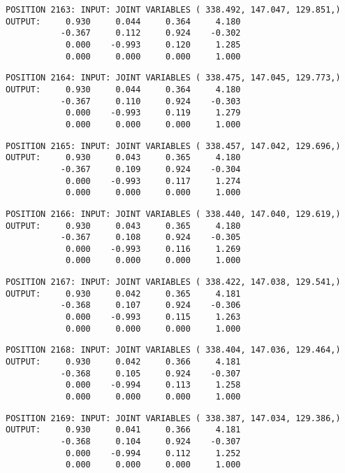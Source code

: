 \begin{verbatim}
POSITION 2163: INPUT: JOINT VARIABLES ( 338.492, 147.047, 129.851,)
OUTPUT:     0.930     0.044     0.364     4.180
           -0.367     0.112     0.924    -0.302
            0.000    -0.993     0.120     1.285
            0.000     0.000     0.000     1.000
\end{verbatim} \pagebreak[1]\begin{verbatim}
POSITION 2164: INPUT: JOINT VARIABLES ( 338.475, 147.045, 129.773,)
OUTPUT:     0.930     0.044     0.364     4.180
           -0.367     0.110     0.924    -0.303
            0.000    -0.993     0.119     1.279
            0.000     0.000     0.000     1.000
\end{verbatim} \pagebreak[1]\begin{verbatim}
POSITION 2165: INPUT: JOINT VARIABLES ( 338.457, 147.042, 129.696,)
OUTPUT:     0.930     0.043     0.365     4.180
           -0.367     0.109     0.924    -0.304
            0.000    -0.993     0.117     1.274
            0.000     0.000     0.000     1.000
\end{verbatim} \pagebreak[1]\begin{verbatim}
POSITION 2166: INPUT: JOINT VARIABLES ( 338.440, 147.040, 129.619,)
OUTPUT:     0.930     0.043     0.365     4.180
           -0.367     0.108     0.924    -0.305
            0.000    -0.993     0.116     1.269
            0.000     0.000     0.000     1.000
\end{verbatim} \pagebreak[1]\begin{verbatim}
POSITION 2167: INPUT: JOINT VARIABLES ( 338.422, 147.038, 129.541,)
OUTPUT:     0.930     0.042     0.365     4.181
           -0.368     0.107     0.924    -0.306
            0.000    -0.993     0.115     1.263
            0.000     0.000     0.000     1.000
\end{verbatim} \pagebreak[1]\begin{verbatim}
POSITION 2168: INPUT: JOINT VARIABLES ( 338.404, 147.036, 129.464,)
OUTPUT:     0.930     0.042     0.366     4.181
           -0.368     0.105     0.924    -0.307
            0.000    -0.994     0.113     1.258
            0.000     0.000     0.000     1.000
\end{verbatim} \pagebreak[1]\begin{verbatim}
POSITION 2169: INPUT: JOINT VARIABLES ( 338.387, 147.034, 129.386,)
OUTPUT:     0.930     0.041     0.366     4.181
           -0.368     0.104     0.924    -0.307
            0.000    -0.994     0.112     1.252
            0.000     0.000     0.000     1.000
\end{verbatim} \pagebreak[1]\begin{verbatim}

\end{verbatim}
